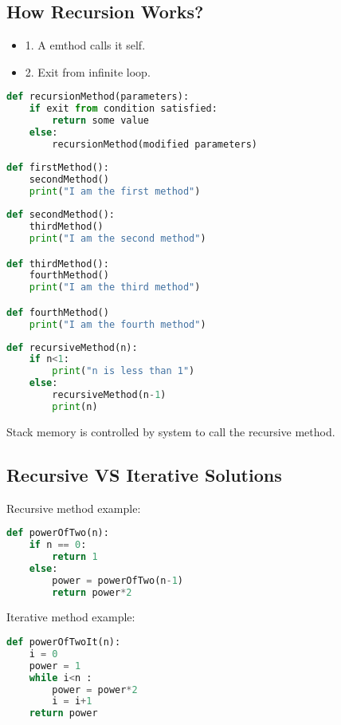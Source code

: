 \documentclass[10pt,letterpaper]{article}
\begin{document}
\subsection{How Recursion Works?}

\begin{itemize}
\item 1. A emthod calls it self.
\item 2. Exit from infinite loop.
\end{itemize}

\begin{lstlisting}[language=Python, caption=$2^{nd}$ Standard Example]
def recursionMethod(parameters):
	if exit from condition satisfied:
		return some value
	else:	
		recursionMethod(modified parameters)
\end{lstlisting}

\begin{lstlisting}[language=Python, caption=$1^{st}$ Good Example]
def firstMethod():
	secondMethod()
	print("I am the first method")
	
def secondMethod():
	thirdMethod()
	print("I am the second method")

def thirdMethod():
	fourthMethod()
	print("I am the third method")

def fourthMethod()
	print("I am the fourth method")
\end{lstlisting}

\begin{lstlisting}[language=Python, caption=$2^{nd}$ Good Example]
def recursiveMethod(n):
	if n<1:
 		print("n is less than 1")
	else:
		recursiveMethod(n-1)
		print(n)
\end{lstlisting}

Stack memory is controlled by system to call the recursive method.

\subsection{Recursive VS Iterative Solutions}

Recursive method example:

\begin{lstlisting}[language=Python, caption=Recursive Method Example]
def powerOfTwo(n):
	if n == 0:
		return 1
	else:
		power = powerOfTwo(n-1)
		return power*2
\end{lstlisting}


Iterative method example:

\begin{lstlisting}[language=Python, caption=Iterative Method Example]
def powerOfTwoIt(n):
	i = 0
	power = 1
	while i<n :
		power = power*2
		i = i+1
	return power
\end{lstlisting}
\end{document}
